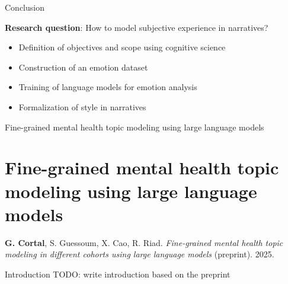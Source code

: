 \documentclass[handout,10pt]{beamer}
\begin{document}
\begin{frame}{Conclusion}

\textbf{Research question}: How to model subjective experience in narratives?

\vspace{0.5cm}
\pause

\begin{itemize}[<+->]
    \item Definition of objectives and scope using cognitive science
    \item Construction of an emotion dataset 
    \item Training of language models for emotion analysis 
    \item Formalization of style in narratives
\end{itemize}



    
\end{frame}

\begin{frame}{}
\Large
\begin{center}
    Fine-grained mental health topic modeling using large language models
    \section{Fine-grained mental health topic modeling using large language models}
\end{center}

\vspace{1.5cm}

\footnotesize

\textbf{G. Cortal}, S. Guessoum, X. Cao, R. Riad. \textit{Fine-grained mental health topic modeling in different cohorts using large language models} (preprint). 2025. 

\end{frame}

\begin{frame}{Introduction}
  TODO: write introduction based on the preprint
\end{frame}
\end{document}
